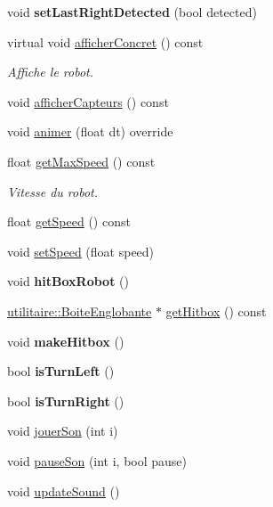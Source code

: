 \begin{DoxyCompactItemize}
\item 
\hypertarget{class_noeud_robot_a47e2bec0b719767da186577d4e8cbb4b}{void {\bfseries set\-Last\-Right\-Detected} (bool detected)}\label{class_noeud_robot_a47e2bec0b719767da186577d4e8cbb4b}

\item 
virtual void \hyperlink{group__inf2990_gad63a8e09cc5ca8cc349f35e0901474e2}{afficher\-Concret} () const 
\begin{DoxyCompactList}\small\item\em Affiche le robot. \end{DoxyCompactList}\item 
void \hyperlink{group__inf2990_gacb5fe63e88cf810f3ecb584342f51c15}{afficher\-Capteurs} () const 
\item 
void \hyperlink{group__inf2990_ga20dbf7ef2ab44f32a5940e2bb76db5d0}{animer} (float dt) override
\item 
float \hyperlink{group__inf2990_ga994999022785e6186d60f9b219d6d832}{get\-Max\-Speed} () const 
\begin{DoxyCompactList}\small\item\em Vitesse du robot. \end{DoxyCompactList}\item 
float \hyperlink{group__inf2990_ga249b8466a20a60fbe7cc46f6e36af62a}{get\-Speed} () const 
\item 
void \hyperlink{group__inf2990_ga559df4c524257f953817bc6b22a467bc}{set\-Speed} (float speed)
\item 
\hypertarget{class_noeud_robot_a2eba2fceeaf59292ec090a03dde2fad1}{void {\bfseries hit\-Box\-Robot} ()}\label{class_noeud_robot_a2eba2fceeaf59292ec090a03dde2fad1}

\item 
\hyperlink{structutilitaire_1_1_boite_englobante}{utilitaire\-::\-Boite\-Englobante} $\ast$ \hyperlink{group__inf2990_ga1b9729298f653ae025f91d362764465e}{get\-Hitbox} () const 
\item 
\hypertarget{group__inf2990_gafe5ebc40e36ac92eb3e9957748ba93c1}{void {\bfseries make\-Hitbox} ()}\label{group__inf2990_gafe5ebc40e36ac92eb3e9957748ba93c1}

\item 
\hypertarget{group__inf2990_ga49f65d4d32c9abd0da2576c07bae97e4}{bool {\bfseries is\-Turn\-Left} ()}\label{group__inf2990_ga49f65d4d32c9abd0da2576c07bae97e4}

\item 
\hypertarget{group__inf2990_ga2a9dbfd2c32f254b20c81ae3f006be31}{bool {\bfseries is\-Turn\-Right} ()}\label{group__inf2990_ga2a9dbfd2c32f254b20c81ae3f006be31}

\item 
void \hyperlink{group__inf2990_gac14ff240c783bbdda3250fe289ff7ad0}{jouer\-Son} (int i)
\item 
void \hyperlink{group__inf2990_gaba7e52b38301ae8426747b934c593b62}{pause\-Son} (int i, bool pause)
\item 
void \hyperlink{group__inf2990_ga4456b762c2417a10769d41597ff738db}{update\-Sound} ()
\end{DoxyCompactItemize}
